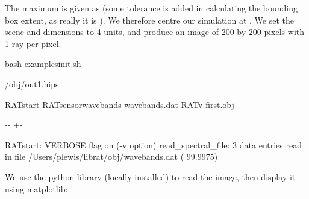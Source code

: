 \documentclass[letterpaper,10pt,english]{sphinxmanual}
\newlength\nbsphinxcodecellspacing
\begin{document}
The maximum  is given as  (some tolerance is added in calculating the bounding box extent, as really it is ). We therefore centre our simulation at . We set the scene  and  dimensions to 4 units, and produce an image of 200 by 200 pixels with 1 ray per pixel.

{
\begin{sphinxVerbatim}[commandchars=\\\{\}]
\llap{\color{nbsphinxin}[31]:\,\hspace{\fboxrule}\hspace{\fboxsep}}\PYGZpc{}\PYGZpc{}bash
 examples\PYGZus{}init.sh

/obj/out1.hips

   RATstart 
    \PYGZhy{}RATsensor\PYGZus{}wavebands wavebands.dat  
    \PYGZhy{}RATv first.obj
\end{sphinxVerbatim}
}

{

\kern-\sphinxverbatimsmallskipamount\kern-\baselineskip
\kern+\FrameHeightAdjust\kern-\fboxrule
\vspace{\nbsphinxcodecellspacing}

\begin{sphinxVerbatim}[commandchars=\\\{\}]
RATstart:
        VERBOSE flag on (-v option)
read\_spectral\_file:   3 data entries read in file /Users/plewis/librat/obj/wavebands.dat
( 99.9975)
\end{sphinxVerbatim}
}

We use the python library  (locally installed) to read the image, then display it using matplotlib:
\end{document}
